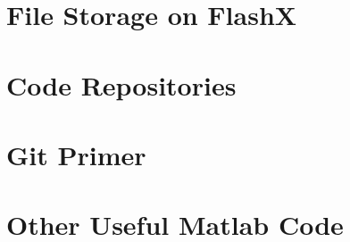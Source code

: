 \section{File Storage on FlashX}

\section{Code Repositories}

\section{Git Primer}

\section{Other Useful Matlab Code}

